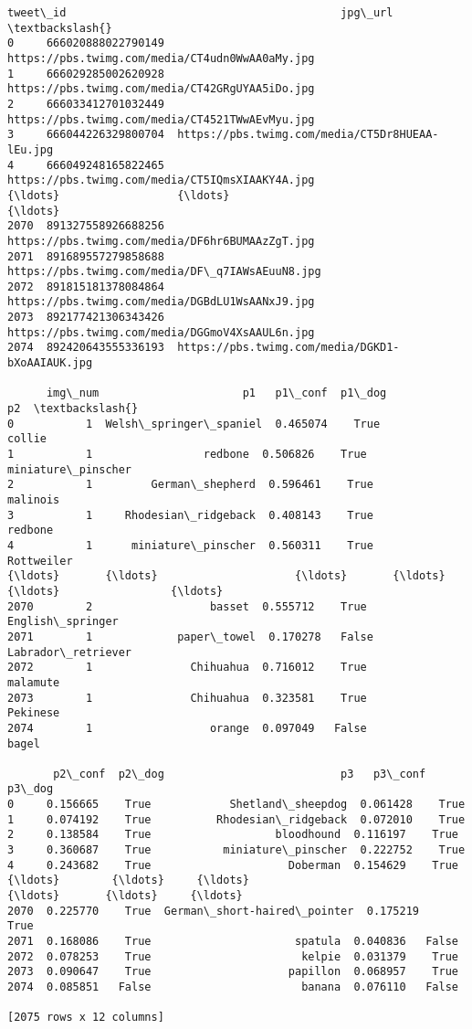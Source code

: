 \documentclass[11pt]{article}
\makeatletter
\newcommand{\boxspacing}{\kern\kvtcb@left@rule\kern\kvtcb@boxsep}
\newcommand{\prompt}[4]{
        {\ttfamily\llap{{\color{#2}[#3]:\hspace{3pt}#4}}\vspace{-\baselineskip}}
    }
\makeatother
\begin{document}
            \begin{tcolorbox}[breakable, size=fbox, boxrule=.5pt, pad at break*=1mm, opacityfill=0]
\prompt{Out}{outcolor}{20}{\boxspacing}
\begin{Verbatim}[commandchars=\\\{\}]
                tweet\_id                                          jpg\_url  \textbackslash{}
0     666020888022790149  https://pbs.twimg.com/media/CT4udn0WwAA0aMy.jpg
1     666029285002620928  https://pbs.twimg.com/media/CT42GRgUYAA5iDo.jpg
2     666033412701032449  https://pbs.twimg.com/media/CT4521TWwAEvMyu.jpg
3     666044226329800704  https://pbs.twimg.com/media/CT5Dr8HUEAA-lEu.jpg
4     666049248165822465  https://pbs.twimg.com/media/CT5IQmsXIAAKY4A.jpg
{\ldots}                  {\ldots}                                              {\ldots}
2070  891327558926688256  https://pbs.twimg.com/media/DF6hr6BUMAAzZgT.jpg
2071  891689557279858688  https://pbs.twimg.com/media/DF\_q7IAWsAEuuN8.jpg
2072  891815181378084864  https://pbs.twimg.com/media/DGBdLU1WsAANxJ9.jpg
2073  892177421306343426  https://pbs.twimg.com/media/DGGmoV4XsAAUL6n.jpg
2074  892420643555336193  https://pbs.twimg.com/media/DGKD1-bXoAAIAUK.jpg

      img\_num                      p1   p1\_conf  p1\_dog                  p2  \textbackslash{}
0           1  Welsh\_springer\_spaniel  0.465074    True              collie
1           1                 redbone  0.506826    True  miniature\_pinscher
2           1         German\_shepherd  0.596461    True            malinois
3           1     Rhodesian\_ridgeback  0.408143    True             redbone
4           1      miniature\_pinscher  0.560311    True          Rottweiler
{\ldots}       {\ldots}                     {\ldots}       {\ldots}     {\ldots}                 {\ldots}
2070        2                  basset  0.555712    True    English\_springer
2071        1             paper\_towel  0.170278   False  Labrador\_retriever
2072        1               Chihuahua  0.716012    True            malamute
2073        1               Chihuahua  0.323581    True            Pekinese
2074        1                  orange  0.097049   False               bagel

       p2\_conf  p2\_dog                           p3   p3\_conf  p3\_dog
0     0.156665    True            Shetland\_sheepdog  0.061428    True
1     0.074192    True          Rhodesian\_ridgeback  0.072010    True
2     0.138584    True                   bloodhound  0.116197    True
3     0.360687    True           miniature\_pinscher  0.222752    True
4     0.243682    True                     Doberman  0.154629    True
{\ldots}        {\ldots}     {\ldots}                          {\ldots}       {\ldots}     {\ldots}
2070  0.225770    True  German\_short-haired\_pointer  0.175219    True
2071  0.168086    True                      spatula  0.040836   False
2072  0.078253    True                       kelpie  0.031379    True
2073  0.090647    True                     papillon  0.068957    True
2074  0.085851   False                       banana  0.076110   False

[2075 rows x 12 columns]
\end{Verbatim}
\end{tcolorbox}
        
\end{document}
